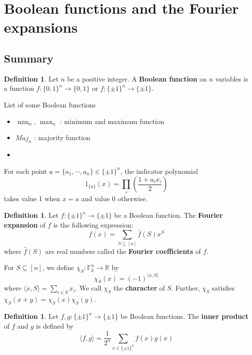 \documentclass[11pt]{article}
\numberwithin{equation}{section}
\theoremstyle{definition}
\newtheorem{defn}[thm]{Definition}
\begin{document}
\setcounter{tocdepth}{5}

\tableofcontents

\clearpage

\section{Boolean functions and the Fourier expansions}

\subsection*{Summary}

\begin{defn}\label{defn:bool_func}
	Let $n$ be a positive integer. A \textbf{Boolean function} on $n$ variables is a function $f:\{0,1\}^n \to \{0,1\}$ or $f:\{\pm 1\}^n \to \{\pm 1\}$.
\end{defn}

List of some Boolean functions
\begin{itemize}
	\item $\min_n$, $\max_n$ : minimum and maximum function
	\item $Maj_n$ : majority function
	\item
\end{itemize}

For each point $a = \{a_1, \cdots, a_n\} \in \{\pm 1\}^n$, the indicator polynomial
$$1_{\{a\}}(x) = \prod_{i} \left(\frac{1+a_i x_i}{2}\right)$$
takes value 1 when $x=a$ and value 0 otherwise.

\begin{defn}\label{defn:fourier_expansion}
	Let $f:\{\pm 1\}^n \to \{\pm 1\}$ be a Boolean function. The \textbf{Fourier expansion} of $f$ is the following expression:
	$$f(x) = \sum_{S \subseteq [n]} \hat{f}(S) x^S$$
	where $\hat{f}(S)$ are real numbers called the \textbf{Fourier coefficients} of $f$.

	For $S \subseteq [n]$, we define $\chi_S: \mathbb{F}_2^n \rightarrow \mathbb{R}$ by
	$$\chi_S(x) = (-1)^{\langle x, S \rangle}$$
	where $\langle x, S \rangle = \sum_{i \in S} x_i$. We call $\chi_S$ the \textbf{character} of $S$.
	Further, $\chi_S$ satisfies $\chi_S(x+y) = \chi_S(x) \chi_S(y)$.
\end{defn}

\begin{defn}\label{defn:inner_prod}
	Let $f,g: \{\pm 1\}^n \to \{\pm 1\}$ be Boolean functions. The \textbf{inner product} of $f$ and $g$ is defined by
	$$\langle f, g \rangle = \frac{1}{2^n} \sum_{x \in \{\pm 1\}^n} f(x) g(x)$$
\end{defn}
\end{document}
